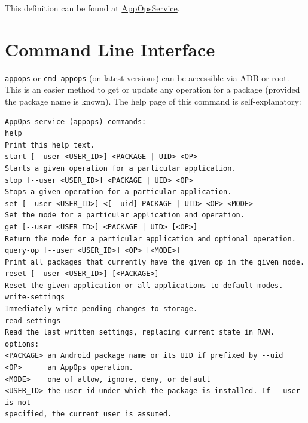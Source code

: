 This definition can be found at
\href{https://android.googlesource.com/platform/frameworks/base/+/master/services/core/java/com/android/server/appop/AppOpsService.java}{AppOpsService}.

\section{Command Line Interface}\label{sec:appops-cli}%
\texttt{appops} or \texttt{cmd appops} (on latest versions) can be accessible via ADB or root. This is an easier method
to get or update any operation for a package (provided the package name is known). The help page of this command is
self-explanatory:
\begin{Verbatim}
AppOps service (appops) commands:
help
Print this help text.
start [--user <USER_ID>] <PACKAGE | UID> <OP>
Starts a given operation for a particular application.
stop [--user <USER_ID>] <PACKAGE | UID> <OP>
Stops a given operation for a particular application.
set [--user <USER_ID>] <[--uid] PACKAGE | UID> <OP> <MODE>
Set the mode for a particular application and operation.
get [--user <USER_ID>] <PACKAGE | UID> [<OP>]
Return the mode for a particular application and optional operation.
query-op [--user <USER_ID>] <OP> [<MODE>]
Print all packages that currently have the given op in the given mode.
reset [--user <USER_ID>] [<PACKAGE>]
Reset the given application or all applications to default modes.
write-settings
Immediately write pending changes to storage.
read-settings
Read the last written settings, replacing current state in RAM.
options:
<PACKAGE> an Android package name or its UID if prefixed by --uid
<OP>      an AppOps operation.
<MODE>    one of allow, ignore, deny, or default
<USER_ID> the user id under which the package is installed. If --user is not
specified, the current user is assumed.
\end{Verbatim}

